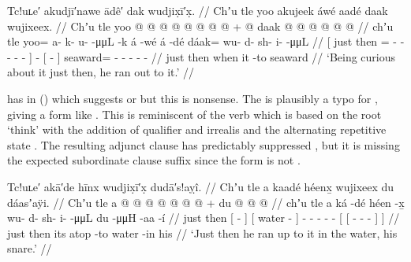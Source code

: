 \ex\label{ex:099-18-curious-ran-to-it}%
%
\begingl
	\glpreamble	Tc!uʟe′ akudjī′nawe ādê′ dak wudjix̣ī′x̣. //
	\glpreamble	Chʼu tle yoo akujeek áwé aadé daak wujixeex. //
	\gla	{} Chʼu tle
			yoo @  @ {} @ {} @ {} @ {} @ {} @ {} {}
		 @ {} +
		{}  @ {} {}
		daak @  @ {} @ {} @ {} @ {} @ {} //
	\glb	{} chʼu tle
			yoo= a- k- u-  -μμL -k {} {}
		á -wé
		{} á -dé {}
		dáak= wu- d- sh- i-  -μμL //
	\glc	{}[ just then
			= - - -  - - \· {}]
		 -
		{}[  - {}]
		seaward= - - - -  - //
	\gld	{} just then   {} {} {} {} {} when {}
		 {}
		{} it -to {}
		seaward  {} {} {} {} {} //
	\glft	‘Being curious about it just then, he ran out to it.’
		//
\endgl
\xe

\citeauthor{swanton:1909} has  in (\lastx) which suggests  or  but this is nonsense.
The  is plausibly a typo for , giving a form like .
This is reminiscent of the verb  which is based on the root  ‘think’ with the addition of qualifier  and irrealis  and the alternating repetitive state .
The resulting adjunct clause  has predictably suppressed , but it is missing the expected subordinate clause suffix  since the form is not .

\ex\label{ex:099-19-ran-to-snare-in-water}%
%
\begingl
	\glpreamble	Tc!uʟe′ akā′de hīnx wudjix̣ī′x̣ dudā′s!aỵî. //
	\glpreamble	Chʼu tle a kaadé héenx̱ wujixeex du dáasʼaÿi. //
	\gla	Chʼu tle {} a  @ {} {} {}  @ {} {}
		 @ {} @ {} @ {} @ {} @ {} +
		{} du {}  @ {} @ {} @ {} {} {} //
	\glb	chʼu tle {} a ká -dé {} {} héen -x̱ {}
		wu- d- sh- i-  -μμL
		{} du {}  -μμH -aa -í {} {} //
	\glc	just then {}[   - {}] {}[ water - {}]
		- - - -  -
		{}[  {}[  - - - {}] {}] //
	\gld	just then {} its atop -to {} {} water -in {}
		 {} {} {} {} {}
		{} his {}  {} {} {} {} {} //
	\glft	‘Just then he ran up to it in the water, his snare.’
		//
\endgl
\xe


